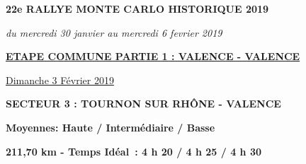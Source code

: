 \documentclass{article}%
\begin{document}
%
\normalsize%
\begin{center} \textbf{\LARGE{22e RALLYE MONTE CARLO HISTORIQUE 2019}} \end{center}%
\begin{center} \textit{du mercredi 30 janvier au mercredi 6 fevrier 2019} \end{center}%
\begin{center} \textbf{\underline{ETAPE COMMUNE PARTIE 1 : VALENCE - VALENCE}} \end{center}%
\begin{flushright} \underline{Dimanche 3 Février 2019
} \end{flushright}%
\begin{flushleft} \textbf{SECTEUR 3 : TOURNON SUR RHÔNE - VALENCE
} \end{flushleft}%
\begin{flushright} \textbf{             Moyennes: Haute / Intermédiaire / Basse
} \end{flushright}%
\begin{flushright} \textbf{211,70 km - Temps Idéal : 4 h 20 / 4 h 25 / 4 h 30
} \end{flushright}%
\end{document}
